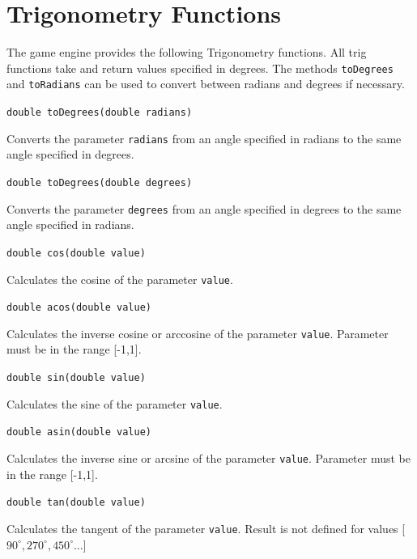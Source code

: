 \documentclass[a4paper, 10pt]{report}
\begin{document}
\section{Trigonometry Functions}

The game engine provides the following Trigonometry functions. All trig functions take and return values specified in degrees. The methods {\tt toDegrees} and {\tt toRadians} can be used to convert between radians and degrees if necessary.

\hrulefill

{\large {\tt double toDegrees(double radians)}}

Converts the parameter {\tt radians} from an angle specified in radians to the same angle specified in degrees.

\hrulefill

{\large {\tt double toDegrees(double degrees)}}

Converts the parameter {\tt degrees} from an angle specified in degrees to the same angle specified in radians.

\hrulefill

{\large {\tt double cos(double value)}}

Calculates the cosine of the parameter {\tt value}.

\hrulefill

{\large {\tt double acos(double value)}}

Calculates the inverse cosine or arccosine of the parameter {\tt value}. Parameter must be in the range [-1,1].

\hrulefill

{\large {\tt double sin(double value)}}

Calculates the sine of the parameter {\tt value}.

\hrulefill

{\large {\tt double asin(double value)}}

Calculates the inverse sine or arcsine of the parameter {\tt value}. Parameter must be in the range [-1,1].

\hrulefill

{\large {\tt double tan(double value)}}

Calculates the tangent of the parameter {\tt value}. Result is not defined for values [$90^{\circ}, 270^{\circ}, 450^{\circ}$...] 
\end{document}
